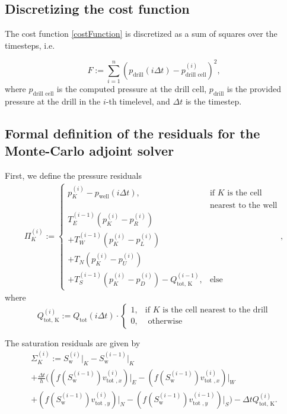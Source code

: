 \documentclass[conference]{IEEEtran}
\begin{document}
\subsection{Discretizing the cost function}
The cost function \eqref{costFunction} is discretized as a sum of squares over the timesteps, i.e.

\begin{equation}
F := \sum_{i=1}^{n} (p_\text{drill}(i\Delta t) - p_\text{drill cell}^{(i)})^2,
\end{equation}
where $p_\text{drill cell}$ is the computed pressure at the drill cell, $p_\text{drill}$ is the provided pressure at the drill in the $i$-th timelevel, and $\Delta t$ is the timestep.

\subsection{Formal definition of the residuals for the Monte-Carlo adjoint solver}
First, we define the pressure residuals
\begin{multline}
\Pi_K^{(i)} := \begin{cases} p_K^{(i)} - p_\text{well}(i\Delta t), & \text{if } K \text{ is the cell}\\&\text{nearest to the well}\\T_E^{(i-1)} (p_K^{(i)} - p_R^{(i)}) \\+ T_W^{(i-1)} (p_K^{(i)} - p_L^{(i)}) \\+ T_N ( p_K^{(i)} - p_U^{(i)}) \\+ T_S^{(i-1)} (p_K^{(i)} - p_D^{(i)}) - Q_\text{tot, K}^{(i-1)}, & \text{else}\end{cases}, 
\end{multline}
where
\begin{equation}
Q_\text{tot, K}^{(i)} := Q_\text{tot}(i\Delta t) \cdot \begin{cases} 1, &\text{if } K \text{ is the cell nearest to the drill}\\0, &\text{ otherwise} \end{cases}
\end{equation}

The saturation residuals are given by
\begin{multline}
\Sigma_K^{(i)} := S_\text{w}^{(i)}\lvert_K - S_\text{w}^{(i-1)}\lvert_{K} \\+ \frac{\Delta t}{h} \biggr((f(S_\text{w}^{(i-1)})v_{\text{tot }, x}^{(i)})\lvert_E - (f(S_\text{w}^{(i-1)})v_{\text{tot }, x}^{(i)})\lvert_W \\+ (f(S_\text{w}^{(i-1)})v_{\text{tot }, y}^{(i)})\lvert_N - (f(S_\text{w}^{(i-1)})v_{\text{tot }, y}^{(i-1)})\lvert_S\biggr) - \Delta t Q_\text{tot, K}^{(i)}.
\end{multline}
\end{document}
